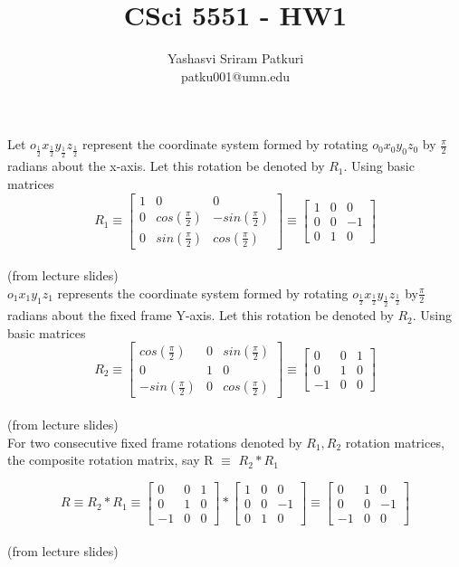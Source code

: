 \documentclass[12pt]{article}
\title{CSci 5551 - HW1}
\author{Yashasvi Sriram Patkuri\\patku001@umn.edu}
\newcommand{\f}[1]{o_{#1}x_{#1}y_{#1}z_{#1}}
\newcommand{\fromslides}{{\\ \color{blue} \hspace*{\fill}(from lecture slides)} \\}
\newcommand{\rx}[1]{\begin{bmatrix} 1 & 0 & 0 \\ 0 & cos(#1) & -sin(#1) \\ 0 & sin(#1) & cos(#1) \end{bmatrix}}
\newcommand{\ry}[1]{\begin{bmatrix} cos(#1) & 0 & sin(#1) \\ 0 & 1 & 0 \\ -sin(#1) & 0 & cos(#1) \end{bmatrix}}
\begin{document}
\maketitle
\pagebreak

\section{}
Let $ \f{\frac{1}{2}} $ represent the coordinate system formed by rotating $ \f{0} $ by $ \frac{\pi}{2} $ radians about the x-axis.
Let this rotation be denoted by $ R_1 $. Using basic matrices
\begin{equation}
  R_1 \equiv \rx{\frac{\pi}{2}} \equiv \begin{bmatrix} 1 & 0 & 0 \\ 0 & 0 & -1 \\ 0 & 1 & 0 \end{bmatrix}
\end{equation}
\fromslides

$ \f{1} $ represents the coordinate system formed by rotating $ \f{\frac{1}{2}} $ by$ \frac{\pi}{2} $ radians about the fixed frame Y-axis.
Let this rotation be denoted by $ R_2 $. Using basic matrices
\begin{equation}
  R_2 \equiv \ry{\frac{\pi}{2}} \equiv \begin{bmatrix} 0 & 0 & 1 \\ 0 & 1 & 0 \\ -1 & 0 & 0 \end{bmatrix}
\end{equation}
\fromslides

For two consecutive fixed frame rotations denoted by $ R_1, R_2 $ rotation matrices, the composite rotation matrix, say R $ \equiv $ $ R_2 * R_1 $

\begin{equation}
  R
  \equiv R_2 * R_1
  \equiv \begin{bmatrix} 0 & 0 & 1 \\ 0 & 1 & 0 \\ -1 & 0 & 0 \end{bmatrix} * \begin{bmatrix} 1 & 0 & 0 \\ 0 & 0 & -1 \\ 0 & 1 & 0 \end{bmatrix}
  \equiv \begin{bmatrix} 0 & 1 & 0 \\ 0 & 0 & -1 \\ -1 & 0 & 0 \end{bmatrix}
\end{equation}
\fromslides
\end{document}
